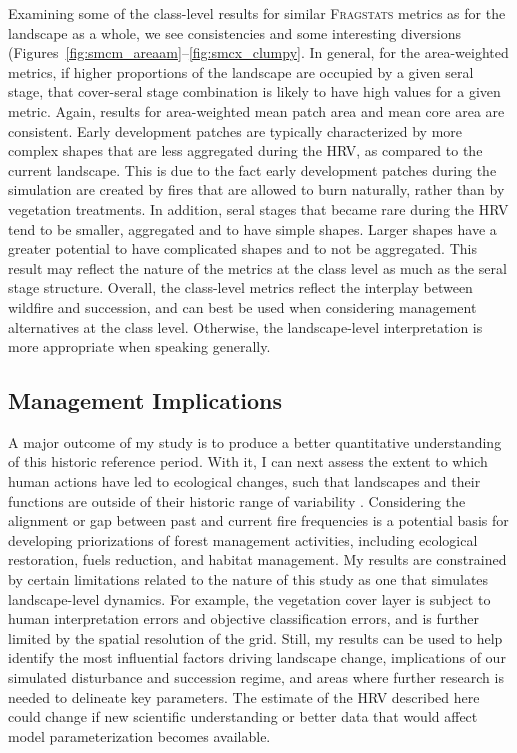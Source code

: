 Examining some of the class-level results for similar \textsc{Fragstats} metrics as for the landscape as a whole, we see consistencies and some interesting diversions (Figures~\ref{fig:smcm_areaam}--\ref{fig:smcx_clumpy}. In general, for the area-weighted metrics, if higher proportions of the landscape are occupied by a given seral stage, that cover-seral stage combination is likely to have high values for a given metric. Again, results for area-weighted mean patch area and mean core area are consistent. Early development patches are typically characterized by more complex shapes that are less aggregated during the HRV, as compared to the current landscape. This is due to the fact early development patches during the simulation are created by fires that are allowed to burn naturally, rather than by vegetation treatments. In addition, seral stages that became rare during the HRV tend to be smaller, aggregated and to have simple shapes. Larger shapes have a greater potential to have complicated shapes and to not be aggregated. This result may reflect the nature of the metrics at the class level as much as the seral stage structure. Overall, the class-level metrics reflect the interplay between wildfire and succession, and can best be used when considering management alternatives at the class level. Otherwise, the landscape-level interpretation is more appropriate when speaking generally. 

\clearpage



\clearpage
\subsection{Management Implications}

A major outcome of my study is to produce a better quantitative understanding of this historic reference period. With it, I can next assess the extent to which human actions have led to ecological changes, such that landscapes and their functions are outside of their historic range of variability \citep{Landres1999,Swetnam1999}. 
%
Considering the alignment or gap between past and current fire frequencies is a potential basis for developing priorizations of forest management activities, including ecological restoration, fuels reduction, and habitat management. 
%
My results are constrained by certain limitations related to the nature of this study as one that simulates landscape-level dynamics. For example, the vegetation cover layer is subject to human interpretation errors and objective classification errors, and is further limited by the spatial resolution of the grid. Still, my results can be used to help identify the most influential factors driving landscape change, implications of our simulated disturbance and succession regime, and areas where further research is needed to delineate key parameters. The estimate of the HRV described here could change if new scientific understanding or better data that would affect model parameterization becomes available.

